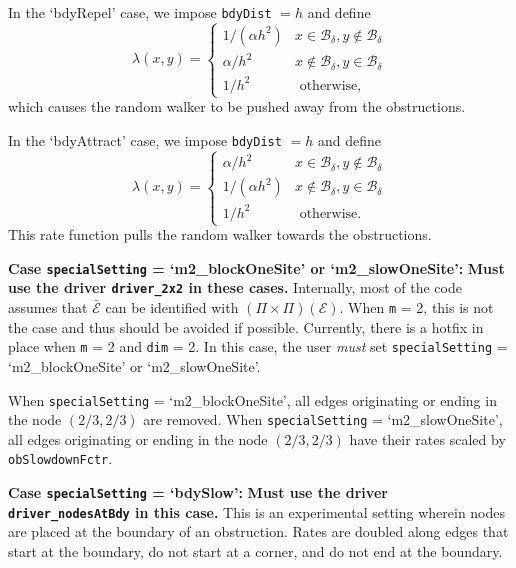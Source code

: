 \documentclass[11pt, oneside]{article}   	%
\theoremstyle{definition}
\newcommand\sE{\mathcal{E}}
\newcommand\oE{\bar{\sE}}
\begin{document}
In the `bdyRepel' case, we impose \texttt{bdyDist} $= h$ and define
\begin{equation}\label{eqn:rate-bdyRepel}
	\lambda(x,y) =
	\begin{cases}
		 1 / (\alpha h^2) & x \in \mathcal{B}_{\delta}, y \notin \mathcal{B}_{\delta}\\
		 \alpha / h^2 & x \notin \mathcal{B}_{\delta}, y \in \mathcal{B}_{\delta} \\
		 1/h^2 & \text{ otherwise,}
	\end{cases}
\end{equation}
which causes the random walker to be pushed away from the obstructions.

In the `bdyAttract' case, we impose \texttt{bdyDist} $= h$ and define
\begin{equation}\label{eqn:rate-bdyAttract}
	\lambda(x,y) =
	\begin{cases}
		 \alpha / h^2 & x \in \mathcal{B}_{\delta}, y \notin \mathcal{B}_{\delta}\\
		 1 / (\alpha h^2) & x \notin \mathcal{B}_{\delta}, y \in \mathcal{B}_{\delta} \\
		 1/h^2 & \text{ otherwise.}
	\end{cases}
\end{equation}
This rate function pulls the random walker towards the obstructions.

{\bf Case \texttt{specialSetting} = `m2\_blockOneSite' or `m2\_slowOneSite':}
{\bf Must use the driver \texttt{driver\_2x2} in these cases.} Internally, most of the code assumes that $\oE$ can be identified with $(\Pi \times \Pi)(\sE)$. When \texttt{m} = 2, this is not the case and thus should be avoided if possible. Currently, there is a hotfix in place when \texttt{m} = 2 and \texttt{dim} = 2. In this case, the user \emph{must} set \texttt{specialSetting} = `m2\_blockOneSite' or `m2\_slowOneSite'.

When \texttt{specialSetting} = `m2\_blockOneSite', all edges originating or ending in the node $(2/3,2/3)$ are removed. When \texttt{specialSetting} = `m2\_slowOneSite', all edges originating or ending in the node $(2/3,2/3)$ have their rates scaled by \texttt{obSlowdownFctr}.

{\bf Case \texttt{specialSetting} = `bdySlow':} {\bf Must use the driver \texttt{driver\_nodesAtBdy} in this case.} This is an experimental setting wherein nodes are placed at the boundary of an obstruction. Rates are doubled along edges that start at the boundary, do not start at a corner, and do not end at the boundary.
 
\end{document}
